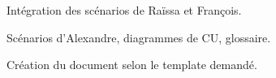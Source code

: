 
Intégration des scénarios de Raïssa et François.
\par

Scénarios d'Alexandre, diagrammes de CU, glossaire.
\par

Création du document selon le template demandé.
\par
